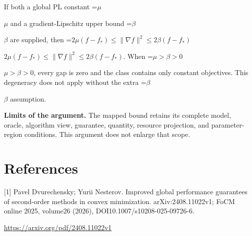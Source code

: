 \documentclass[10pt,a4paper]{article}
\newcommand{\AtlasMath}[1]{\par\begingroup\centering\setbox0=\hbox{$\displaystyle #1$}\ifdim\wd0>1.4\linewidth\typeout{ATLAS WIDE FORMULA: \the\wd0}\fi\ifdim\wd0>\linewidth\resizebox{\linewidth}{!}{\box0}\else\box0\fi\par\endgroup}
\newcommand{\AtlasInlineMath}[1]{\begingroup\setbox0=\hbox{$#1$}\ifdim\wd0>.4\linewidth\endgroup\AtlasMath{#1}\else\endgroup$#1$\fi}
\begin{document}
If both a global PL constant \AtlasInlineMath{\mu} and a gradient-Lipschitz upper bound \AtlasInlineMath{\beta} are supplied, then \AtlasInlineMath{2\mu(f-f_*)\le\|\nabla f\|^2\le2\beta(f-f_*)}. When \AtlasInlineMath{\mu>\beta>0}, every gap is zero and the class contains only constant objectives. This degeneracy does not apply without the extra \AtlasInlineMath{\beta} assumption.

\textbf{Limits of the argument.} The mapped bound retains its complete model, oracle, algorithm view, guarantee, quantity, resource projection, and parameter-region conditions. This argument does not enlarge that scope.

\section{References}
[1] Pavel Dvurechensky; Yurii Nesterov. Improved global performance guarantees of second-order methods in convex minimization. arXiv:2408.11022v1; FoCM online 2025, volume26 (2026), DOI10.1007/s10208-025-09726-6.

\url{https://arxiv.org/pdf/2408.11022v1}
\end{document}
